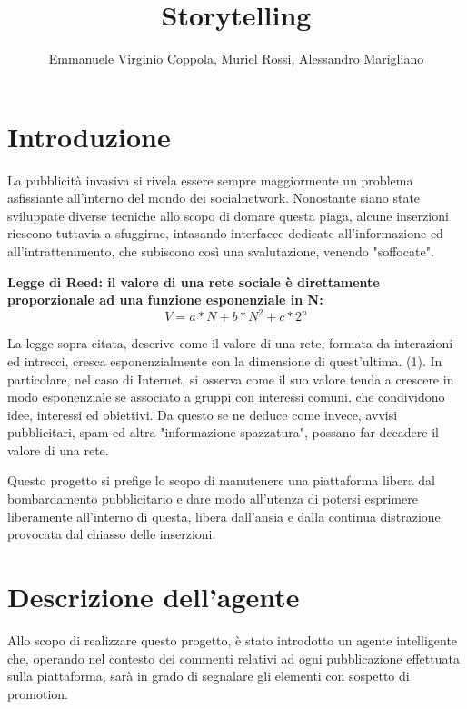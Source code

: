 \documentclass{article} %
\title{Storytelling} %
\author{Emmanuele Virginio Coppola, Muriel Rossi, Alessandro Marigliano} %
\begin{document}
    \maketitle %

    
    \section{Introduzione} %
    
    La pubblicità invasiva si rivela essere sempre maggiormente un problema asfissiante all'interno del mondo dei socialnetwork. Nonostante siano state sviluppate diverse tecniche
    allo scopo di domare questa piaga, alcune inserzioni riescono tuttavia a sfuggirne, intasando interfacce dedicate all'informazione ed 
    all'intrattenimento, che subiscono così una svalutazione, venendo "soffocate".
    

    \textbf{Legge di Reed: il valore di una rete sociale è direttamente proporzionale ad una funzione esponenziale in N:}
    \begin{equation} %
        V=a*N+b*N^2 + c*2^n
        \end{equation}
    

    La legge sopra citata, descrive come il valore di una rete, formata da interazioni ed intrecci, cresca esponenzialmente con la dimensione di quest'ultima. (1).
    In particolare, nel caso di Internet, si osserva come il suo valore tenda a crescere in modo esponenziale se associato a gruppi con interessi
     comuni, che condividono idee, interessi ed obiettivi.
    Da questo se ne deduce come invece, avvisi pubblicitari, spam ed altra "informazione spazzatura", possano far decadere il valore di una rete.
    
    Questo progetto si prefige lo scopo di manutenere una piattaforma libera dal bombardamento pubblicitario e dare modo all'utenza di potersi esprimere liberamente
    all'interno di questa, libera dall'ansia e dalla continua distrazione provocata dal chiasso delle inserzioni.
    \section{Descrizione dell'agente}
    Allo scopo di realizzare questo progetto, è stato introdotto un agente intelligente che, operando nel contesto dei commenti relativi ad ogni 
    pubblicazione effettuata sulla piattaforma, sarà in grado di segnalare gli elementi con sospetto di promotion.
\end{document}
